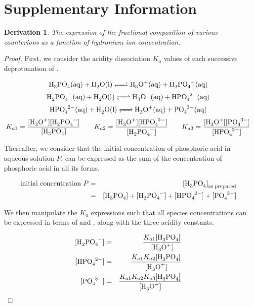 \documentclass[10pt,twoside,a4paper]{article}
\newtheorem{thm}{Derivation}
\begin{document}
\setcounter{page}{11}

\section*{Supplementary Information}

    \begin{thm}The expression of the fractional composition of various counterions as a function of hydronium ion concentration.
    \end{thm}


	\begin{proof} First, we consider the acidity dissociation $K_a$ values of each successive deprotonation of .

		\begin{equation*}
 		\ce{H3PO4(aq) + H2O(l) <=> H3O+(aq) + H2PO4^-(aq)}
 		\end{equation*}
 		\begin{equation*}
 		\ce{H2PO4^-(aq) + H2O(l) <=> H3O+(aq) + HPO4^{2-}(aq)}
 		\end{equation*}
 		\begin{equation*}
 		\ce{HPO4^{2-}(aq) + H2O(l) <=> H3O+(aq) + PO4^{3-}(aq)}
 		\end{equation*}
 		\begin{equation*}
 		K_{a1}=\frac{\ce{[H3O+][H2PO4^-]}}{\ce{[H3PO4]}} \qquad K_{a2}=\frac{\ce{[H3O+][HPO4^{2-}]}}{\ce{[H2PO4^-]}}
 		\qquad K_{a3}=\frac{\ce{[H3O+][PO4^{3-}]}}{\ce{[HPO4^{2-}]}}
 		\end{equation*}

 	Thereafter, we consider that the initial concentration of phosphoric acid in aqueous solution $P$, can be expressed as
 	the sum of the concentration of phosphoric acid in all its forms.

 		\begin{eqnarray}
 		\text{initial concentration } P & = & \ce{[H3PO4]}_\text{as prepared} \nonumber \\
 		& = & \ce{[H3PO4] + [H2PO4^-] + [HPO4^{2-}] + [PO4^{3-}]} \nonumber
 		\end{eqnarray}

 	We then manipulate the $K_a$ expressions such that all species concentrations can be expressed in terms of \ce{[H_3PO_4]} and \ce{[H3O+]}, along with the three acidity constants.

 	\begin{eqnarray}
 		\ce{[H2PO4^{-}]} & = & \frac{K_{a1}\ce{[H3PO4]}}{\ce{[H3O+]}} \nonumber \\
 		\ce{[HPO4^{2-}]} & = & \frac{K_{a1}K_{a2}\ce{[H3PO4]}}{\ce{[H3O+]}} \nonumber \\
 		\ce{[PO4^{3-}]} & = & \frac{K_{a1}K_{a2}K_{a3}\ce{[H3PO4]}}{\ce{[H3O+]}} \nonumber
 		\end{eqnarray}


\end{proof}
\end{document}
